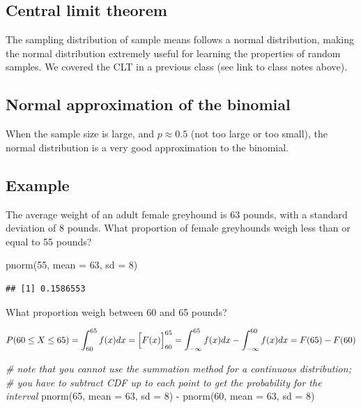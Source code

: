 \documentclass[
]{article}
\newenvironment{Shaded}{\begin{snugshade}}{\end{snugshade}}
\newcommand{\AttributeTok}[1]{\textcolor[rgb]{0.77,0.63,0.00}{#1}}
\newcommand{\CommentTok}[1]{\textcolor[rgb]{0.56,0.35,0.01}{\textit{#1}}}
\newcommand{\DecValTok}[1]{\textcolor[rgb]{0.00,0.00,0.81}{#1}}
\newcommand{\FunctionTok}[1]{\textcolor[rgb]{0.00,0.00,0.00}{#1}}
\newcommand{\NormalTok}[1]{#1}
\newcommand{\SpecialCharTok}[1]{\textcolor[rgb]{0.00,0.00,0.00}{#1}}
\begin{document}
\hypertarget{central-limit-theorem}{%
\subsection{Central limit theorem}\label{central-limit-theorem}}

The sampling distribution of sample means follows a normal distribution,
making the normal distribution extremely useful for learning the
properties of random samples. We covered the CLT in a previous class
(see link to class notes above).

\hypertarget{normal-approximation-of-the-binomial}{%
\subsection{Normal approximation of the
binomial}\label{normal-approximation-of-the-binomial}}

When the sample size is large, and \(p \approx 0.5\) (not too large or
too small), the normal distribution is a very good approximation to the
binomial.

\hypertarget{example}{%
\subsection{Example}\label{example}}

The average weight of an adult female greyhound is 63 pounds, with a
standard deviation of 8 pounds. What proportion of female greyhounds
weigh less than or equal to 55 pounds?

\begin{Shaded}
\begin{Highlighting}[]
\FunctionTok{pnorm}\NormalTok{(}\DecValTok{55}\NormalTok{, }\AttributeTok{mean =} \DecValTok{63}\NormalTok{, }\AttributeTok{sd =} \DecValTok{8}\NormalTok{)}
\end{Highlighting}
\end{Shaded}

\begin{verbatim}
## [1] 0.1586553
\end{verbatim}

What proportion weigh between 60 and 65 pounds?

\[ P(60 \le X \le 65) = \int_{60}^{65}f(x)dx =\Big[ F(x) \Big]_{60}^{65}  \\
= \int_{-\infty}^{65}f(x)dx -  
               \int_{-\infty}^{60}f(x)dx = F(65) - F(60)  \]

\begin{Shaded}
\begin{Highlighting}[]
\CommentTok{\# note that you cannot use the summation method for a continuous distribution;}
\CommentTok{\# you have to subtract CDF up to each point to get the probability for the interval}
\FunctionTok{pnorm}\NormalTok{(}\DecValTok{65}\NormalTok{, }\AttributeTok{mean =} \DecValTok{63}\NormalTok{, }\AttributeTok{sd =} \DecValTok{8}\NormalTok{) }\SpecialCharTok{{-}} \FunctionTok{pnorm}\NormalTok{(}\DecValTok{60}\NormalTok{, }\AttributeTok{mean =} \DecValTok{63}\NormalTok{, }\AttributeTok{sd =} \DecValTok{8}\NormalTok{)}
\end{Highlighting}
\end{Shaded}
\end{document}
